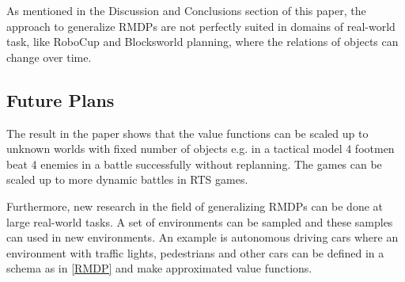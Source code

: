 As mentioned in the Discussion and Conclusions section of this paper, the approach to generalize RMDPs are not perfectly suited in domains of real-world task, like RoboCup and Blocksworld\citep{SLANEY2001119} planning, where the relations of objects can change over time.


\subsection{Future Plans}

The result in the paper shows that the value functions can be scaled up to unknown worlds with fixed number of objects e.g. in a tactical model 4 footmen beat 4 enemies in a battle successfully without replanning. The games can be scaled up to more dynamic battles in RTS games. 

Furthermore, new research in the field of generalizing RMDPs can be done at large real-world tasks. A set of environments can be sampled and these samples can used in new environments. An example is autonomous driving cars where an environment with traffic lights, pedestrians and other cars can be defined in a schema as in \ref{RMDP} and make approximated value functions.